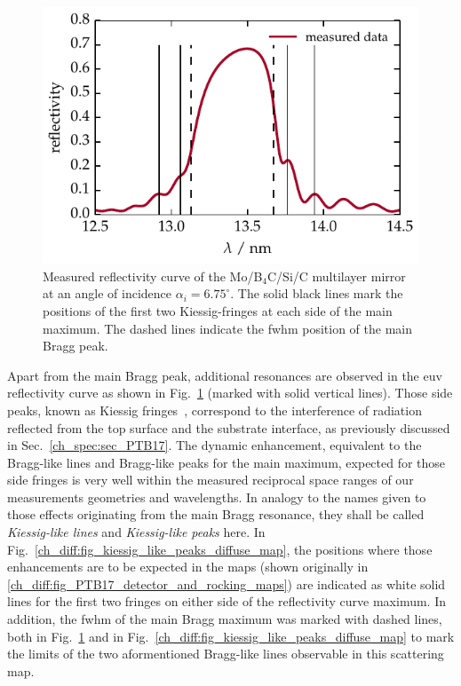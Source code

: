 \begin{figure}[htbp]
        \includegraphics{img/kiessig_like_peaks_reflectivity_curve} \caption[Measured reflectivity curve of the Mo/B$_4$C/Si/C multilayer mirror.]{Measured reflectivity curve of the Mo/B$_4$C/Si/C multilayer mirror at an angle of incidence $\alpha_i = 6.75^\circ$. The solid black lines mark the positions of the first two Kiessig-fringes at each side of the main maximum. The dashed lines indicate the \gls{fwhm} position of the main Bragg peak.}
        \label{ch_diff:fig_ptb17_reflectance_AOI_675} 
\end{figure}
Apart from the main Bragg peak, additional resonances are observed in the \gls{euv} reflectivity curve as shown in Fig.~\ref{ch_diff:fig_ptb17_reflectance_AOI_675} (marked with solid vertical lines). Those side peaks, known as Kiessig fringes~\cite{kiessig_interferenz_1931}, correspond to the interference of radiation reflected from the top surface and the substrate interface, as previously discussed in Sec.~\ref{ch_spec:sec_PTB17}. The dynamic enhancement, equivalent to the Bragg-like lines and Bragg-like peaks for the main maximum, expected for those side fringes is very well within the measured reciprocal space ranges of our measurements geometries and wavelengths. In analogy to the names given to those effects originating from the main Bragg resonance, they shall be called \emph{Kiessig-like lines} and \emph{Kiessig-like peaks} here. In Fig.~\ref{ch_diff:fig_kiessig_like_peaks_diffuse_map}, the positions where those enhancements are to be expected in the maps (shown originally in \ref{ch_diff:fig_PTB17_detector_and_rocking_maps}) are indicated as white solid lines for the first two fringes on either side of the reflectivity curve maximum. In addition, the \gls{fwhm} of the main Bragg maximum was marked with dashed lines, both in Fig.~\ref{ch_diff:fig_ptb17_reflectance_AOI_675} and in Fig.~\ref{ch_diff:fig_kiessig_like_peaks_diffuse_map} to mark the limits of the two aformentioned Bragg-like lines observable in this scattering map.
